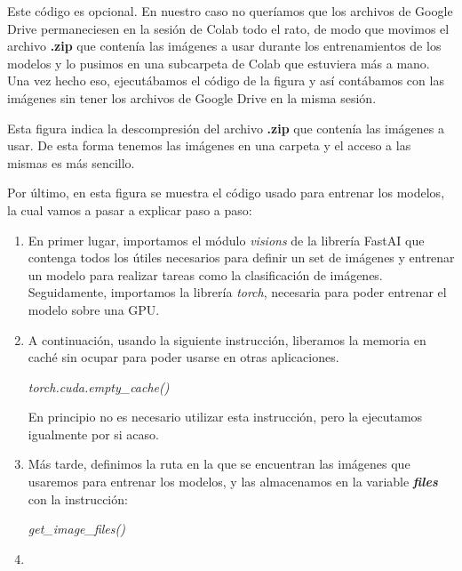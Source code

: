 
Este código es opcional. En nuestro caso no queríamos que los archivos de Google Drive permaneciesen en la sesión de Colab todo el rato, de modo que movimos el archivo \textbf{.zip} que contenía las imágenes a usar durante los entrenamientos de los modelos y lo pusimos en una subcarpeta de Colab que estuviera más a mano. Una vez hecho eso, ejecutábamos el código de la figura y así contábamos con las imágenes sin tener los archivos de Google Drive en la misma sesión.


Esta figura indica la descompresión del archivo \textbf{.zip} que contenía las imágenes a usar. De esta forma tenemos las imágenes en una carpeta y el acceso a las mismas es más sencillo.


Por último, en esta figura se muestra el código usado para entrenar los modelos, la cual vamos a pasar a explicar paso a paso:

\begin{enumerate}
\item En primer lugar, importamos el módulo \textit{visions} de la librería FastAI que contenga todos los útiles necesarios para definir un set de imágenes y entrenar un modelo para realizar tareas como la clasificación de imágenes. Seguidamente, importamos la librería \textit{torch}, necesaria para poder entrenar el modelo sobre una \ac{GPU}. %
\item A continuación, usando la siguiente instrucción, liberamos la memoria en caché sin ocupar para poder usarse en otras aplicaciones.

\begin{center}
\textit{torch.cuda.empty_cache()}
\end{center}

En principio no es necesario utilizar esta instrucción, pero la ejecutamos igualmente por si acaso.
\item Más tarde, definimos la ruta en la que se encuentran las imágenes que usaremos para entrenar los modelos, y las almacenamos en la variable \textbf{\textit{files}} con la instrucción:

\begin{center}
\textit{get_image_files()}
\end{center}

\item 
\end{enumerate}